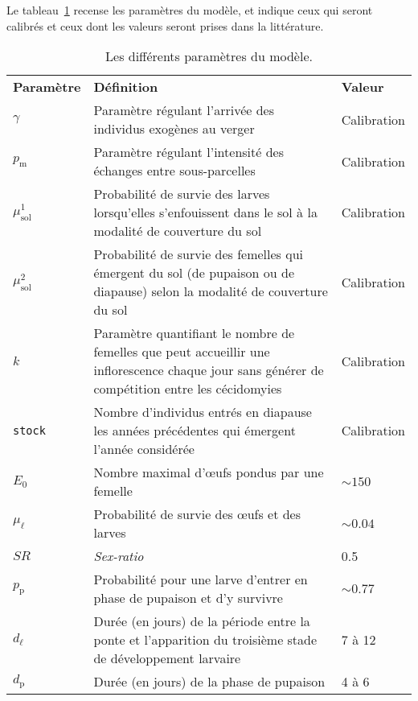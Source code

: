 Le tableau~\ref{tab:param} recense les paramètres du modèle, et indique ceux qui seront calibrés et ceux dont les valeurs seront prises dans la littérature.


    \clearpage%

    \begin{landscape}%
\begin{table}
\caption{Les différents paramètres du modèle.}
\label{tab:param}
\centering
{
\begin{tabular}{p{2cm}p{11.9cm}p{5cm}}
\textbf{Paramètre} & \textbf{Définition} & \textbf{Valeur}\\
$\gamma$ & Paramètre régulant l'arrivée des individus exogènes au verger & Calibration\\
$p_{\text{m}}$ & Paramètre régulant l'intensité des échanges entre sous-parcelles & Calibration\\
$\mu_{\text{sol}}^1$ & Probabilité de survie des larves lorsqu'elles s'enfouissent dans le sol à la modalité de couverture du sol & Calibration\\
$\mu_{\text{sol}}^2$ & Probabilité de survie des femelles qui émergent du sol (de pupaison ou de diapause) selon la modalité de couverture du sol & Calibration\\
$k$ & Paramètre quantifiant le nombre de femelles que peut accueillir une inflorescence chaque jour sans générer de compétition entre les cécidomyies & Calibration\\
\texttt{stock} & Nombre d'individus entrés en diapause les années précédentes qui émergent l'année considérée & Calibration  \\
$E_0$ & Nombre maximal d'œufs pondus par une femelle & $\sim\!150$ \citep{paul}\\
$\mu_{\ell}$ & Probabilité de survie des œufs et des larves & $\sim\!0.04$ \citep{paul}\\
$\mathit{SR}$ & \textit{Sex-ratio} & 0.5 \citep{paul}\\
$p_{\text{p}}$ & Probabilité pour une larve d'entrer en phase de pupaison et d'y survivre & $\sim\! 0.77$ \citep{pauldiap}\\
$d_{\ell}$ & Durée (en jours) de la période entre la ponte et l'apparition du troisième stade de développement larvaire & 7 à 12 \citep{paul} \\
$d_{\text{p}}$ & Durée (en jours) de la phase de pupaison & 4 à 6 \citep{paul}
\end{tabular}
}
\end{table}
    \end{landscape}

